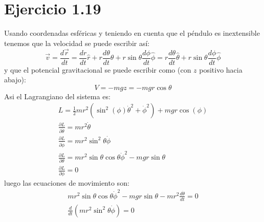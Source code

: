 \documentclass[letterpaper,12pt]{article}
\begin{document}
\section*{Ejercicio 1.19}
Usando coordenadas esf\'ericas y teniendo en cuenta que el p\'endulo es inextensible tenemos que la velocidad se puede escribir as\'i:
\begin{equation}
\vec v=\frac{d\vec r}{dt}=\frac{dr}{dt}\hat r+r\frac{d\theta}{dt}\hat \theta+r \sin \theta \frac{d\phi}{dt} \hat \phi=r\frac{d\theta}{dt}\hat \theta+r \sin \theta \frac{d\phi}{dt} \hat \phi
\end{equation}
y que el potencial gravitacional se puede escribir como (con $z$ positivo hacia abajo):
\begin{equation}
V=-mgz=-mgr \cos \theta
\end{equation}
Asi el Lagrangiano del sistema es:
\begin{eqnarray}
L=\frac{1}{2} m r^2 \left(\sin ^2(\phi ) \dot \theta^2+\dot \phi^2\right) +mgr \cos (\phi ) \\
\frac{\partial L}{\partial \dot \theta}=m r^2 \dot \theta\\
\frac{\partial L}{\partial \dot \phi}=m r^2 \sin^2\theta \dot \phi\\
\frac{\partial L}{\partial \theta}=m r^2 \sin \theta \cos \theta \dot \phi^2-m g r \sin \theta\\
\frac{\partial L}{\partial \phi}=0
\end{eqnarray}
luego las ecuaciones de movimiento son:
\begin{eqnarray}
m r^2 \sin \theta \cos \theta \dot \phi^2-m g r \sin \theta-m r^2 \frac{d\dot \theta}{dt}=0\\
\frac{d }{dt}\left( m r^2 \sin^2\theta \dot \phi\right)=0\\
\end{eqnarray}
\end{document}
